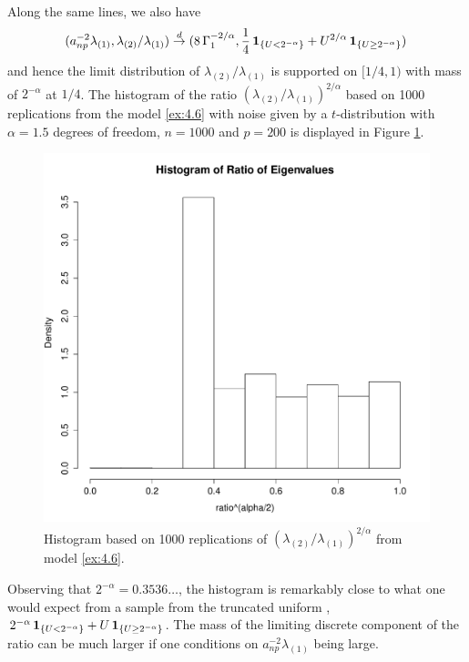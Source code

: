 \begin{example}
Along the same lines, we also have
\begin{equation*}
(a_{np}^{-2}\lambda_{(1)},\lambda_{(2)}/\lambda_{(1)}) \stackrel{d}{\rightarrow}(
8\,\Gamma_1^{-2/\alpha},\frac{1}{4}\,\mathbf{1}_{\{U<2^{-\alpha}\}}+U^{2/\alpha}\,\mathbf{1}_{\{U\ge
  2^{-\alpha}\}})\,
\end{equation*}
and hence the limit distribution of $\lambda_{(2)}/\lambda_{(1)}$ is supported on $[1/4,1)$ with  mass of $2^{-\alpha}$ at $1/4$.  The histogram of the ratio $\left(\lambda_{(2)}/\lambda_{(1)}\right)^{2/\alpha}$ based on 1000 replications from the model \eqref{ex:4.6} with noise given by a $t$-distribution with $\alpha=1.5$ degrees of freedom, $n=1000$ and $p=200$ is displayed in Figure \ref{fig:1}.
\begin{figure} [h]
\begin{center}
\includegraphics[scale=.35]{histogram.pdf}
\end{center}
\caption{Histogram based on 1000 replications of $\left(\lambda_{(2)}/\lambda_{(1)}\right)^{2/\alpha}$ from model \eqref{ex:4.6}.}
\label{fig:1}
\end{figure} Observing that $2^{-\alpha}=0.3536\ldots$,
the histogram is remarkably close to what one would expect from a sample from the truncated
uniform \ds , $2^{-\alpha}\, \mathbf{1}_{\{U<2^{-\alpha}\}}+U\, \mathbf{1}_{\{U\ge 2^{-\alpha} \}}$.
The mass of the limiting discrete component of the ratio can be much
larger if one conditions on $a_{np}^{-2}\lambda_{(1)}$ being large.

\end{example}
